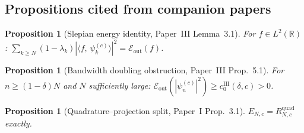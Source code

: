 \documentclass[12pt,a4paper]{amsart}
\newtheorem{proposition}[theorem]{Proposition}
\theoremstyle{definition}
\newcommand{\psin}{\psi_n^{(c)}}
\newcommand{\ip}[2]{\langle #1,\, #2\rangle}
\newcommand{\Eout}{\mathcal{E}_{\mathrm{out}}}
\begin{document}
\subsection{Propositions cited from companion papers}

\begin{proposition}[Slepian energy identity,
Paper~III Lemma~3.1]\label{lem:slepian_cite}
For $f\in L^2(\mathbb{R})$:
$\sum_{k\ge N}(1-\lambda_k)|\ip{f}{\psi_k^{(c)}}|^2 = \Eout(f)$.
\end{proposition}

\begin{proposition}[Bandwidth doubling obstruction,
Paper~III Prop.~5.1]\label{prop:bwdoubling_cite}
For $n\ge(1-\delta)N$ and $N$ sufficiently large:
$\Eout(|\psin|^2) \ge c_0^{\mathrm{III}}(\delta,c) > 0$.
\end{proposition}

\begin{proposition}[Quadrature--projection split,
Paper~I Prop.~3.1]\label{prop:xry_split_cite}
$E_{N,c} = R^{\mathrm{quad}}_{N,c}$ exactly.
\end{proposition}
\end{document}
